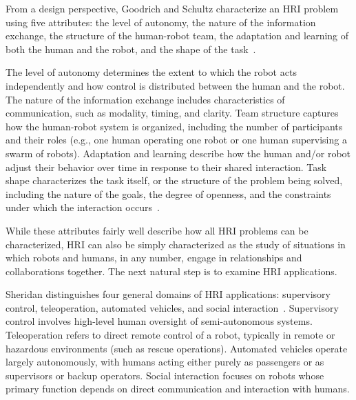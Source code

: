From a design perspective, Goodrich and Schultz characterize an HRI problem using five attributes: the level of autonomy, the nature of the information exchange, the structure of the human-robot team, the adaptation and learning of both the human and the robot, and the shape of the task~\cite[216--217]{goodrich_human-robot_2007}.

The level of autonomy determines the extent to which the robot acts independently and how control is distributed between the human and the robot. The nature of the information exchange includes characteristics of communication, such as modality, timing, and clarity. Team structure captures how the human-robot system is organized, including the number of participants and their roles (e.g., one human operating one robot or one human supervising a swarm of robots). Adaptation and learning describe how the human and/or robot adjust their behavior over time in response to their shared interaction. Task shape characterizes the task itself, or the structure of the problem being solved, including the nature of the goals, the degree of openness, and the constraints under which the interaction occurs~\cite[216--232]{goodrich_human-robot_2007}.

While these attributes fairly well describe how all HRI problems can be characterized, HRI can also be simply characterized as the study of situations in which robots and humans, in any number, engage in relationships and collaborations together. The next natural step is to examine HRI applications.

Sheridan distinguishes four general domains of HRI applications: supervisory control, teleoperation, automated vehicles, and social interaction~\cite[525--526]{Sheridan2016HRI}. Supervisory control involves high-level human oversight of semi-autonomous systems. Teleoperation refers to direct remote control of a robot, typically in remote or hazardous environments (such as rescue operations). Automated vehicles operate largely autonomously, with humans acting either purely as passengers or as supervisors or backup operators. Social interaction focuses on robots whose primary function depends on direct communication and interaction with humans.

